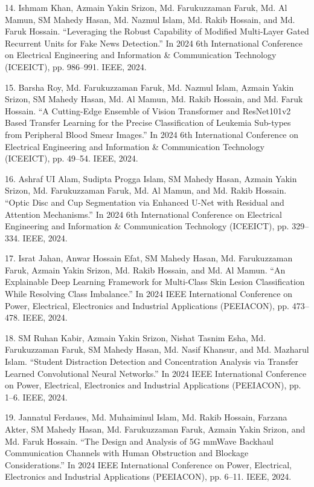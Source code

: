 \documentclass[a4paper,10pt]{article}
\newlength{\cvcolumngapwidth}
\newlength{\cvleftcolumnwidth}
\newlength{\cvrightcolumnwidth}
\newcommand{\cvdurationstyle}[1]{{\small\cvdurationfont\textcolor{cvdurationcolor}{#1}}}
\newlength{\cvafteritemskipamount}
\newlength{\cvparskip}
\newcommand{\cvitem}[2]{
    \begin{minipage}[t]{\cvleftcolumnwidth}
        \raggedleft #1
    \end{minipage}%
    \hspace{\cvcolumngapwidth}%
    \begin{minipage}[t]{\cvrightcolumnwidth}
        \setlength{\parskip}{\cvparskip} #2
    \end{minipage}

    \vspace{\cvafteritemskipamount}
}
\begin{document}
\cvitem{
    \cvdurationstyle{}
}{
14. Ishmam Khan, Azmain Yakin Srizon, Md. Farukuzzaman Faruk, Md. Al Mamun, SM Mahedy Hasan, Md. Nazmul Islam, Md. Rakib Hossain, and Md. Faruk Hossain. “Leveraging the Robust Capability of Modified Multi-Layer Gated Recurrent Units for Fake News Detection.” In 2024 6th International Conference on Electrical Engineering and Information \& Communication Technology (ICEEICT), pp. 986–991. IEEE, 2024.
}

\cvitem{
    \cvdurationstyle{}
}{
15. Barsha Roy, Md. Farukuzzaman Faruk, Md. Nazmul Islam, Azmain Yakin Srizon, SM Mahedy Hasan, Md. Al Mamun, Md. Rakib Hossain, and Md. Faruk Hossain. “A Cutting-Edge Ensemble of Vision Transformer and ResNet101v2 Based Transfer Learning for the Precise Classification of Leukemia Sub-types from Peripheral Blood Smear Images.” In 2024 6th International Conference on Electrical Engineering and Information \& Communication Technology (ICEEICT), pp. 49–54. IEEE, 2024.
}

\cvitem{
    \cvdurationstyle{}
}{
16. Ashraf UI Alam, Sudipta Progga Islam, SM Mahedy Hasan, Azmain Yakin Srizon, Md. Farukuzzaman Faruk, Md. Al Mamun, and Md. Rakib Hossain. “Optic Disc and Cup Segmentation via Enhanced U-Net with Residual and Attention Mechanisms.” In 2024 6th International Conference on Electrical Engineering and Information \& Communication Technology (ICEEICT), pp. 329–334. IEEE, 2024.
}

\cvitem{
    \cvdurationstyle{}
}{
17. Israt Jahan, Anwar Hossain Efat, SM Mahedy Hasan, Md. Farukuzzaman Faruk, Azmain Yakin Srizon, Md. Rakib Hossain, and Md. Al Mamun. “An Explainable Deep Learning Framework for Multi-Class Skin Lesion Classification While Resolving Class Imbalance.” In 2024 IEEE International Conference on Power, Electrical, Electronics and Industrial Applications (PEEIACON), pp. 473–478. IEEE, 2024.
}

\cvitem{
    \cvdurationstyle{}
}{
18. SM Ruhan Kabir, Azmain Yakin Srizon, Nishat Tasnim Esha, Md. Farukuzzaman Faruk, SM Mahedy Hasan, Md. Nasif Khansur, and Md. Mazharul Islam. “Student Distraction Detection and Concentration Analysis via Transfer Learned Convolutional Neural Networks.” In 2024 IEEE International Conference on Power, Electrical, Electronics and Industrial Applications (PEEIACON), pp. 1–6. IEEE, 2024.
}

\cvitem{
    \cvdurationstyle{}
}{
19. Jannatul Ferdaues, Md. Muhaiminul Islam, Md. Rakib Hossain, Farzana Akter, SM Mahedy Hasan, Md. Farukuzzaman Faruk, Azmain Yakin Srizon, and Md. Faruk Hossain. “The Design and Analysis of 5G mmWave Backhaul Communication Channels with Human Obstruction and Blockage Considerations.” In 2024 IEEE International Conference on Power, Electrical, Electronics and Industrial Applications (PEEIACON), pp. 6–11. IEEE, 2024.
}
\end{document}
